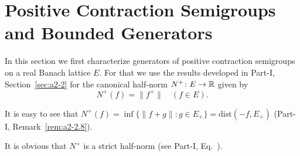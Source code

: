 \section{Positive Contraction Semigroups and Bounded Generators}\label{sec:c2-1}%
In this section we first characterize generators of positive contraction semigroups on a real Banach lattice $E$.
For that we use the results developed in Part-I, Section~\ref{sec:a2-2} for the canonical half-norm $N^{+} \colon E \to \mathbb{R}$ given by
\begin{equation}\label{eq:c2-1.1}
N^{+}(f) = \|f^{+}\| \quad (f \in E).
\end{equation}
\begin{remark*}\label{rem:c2-1.1}
%
It is easy to see that $N^{+}(f) = \inf \{\|f+g\| \colon g \in E_{+}\} = \text{dist}(-f,E_{+})$ (\cf Part-I, Remark~\ref{rem:a2-2.8}). 
\end{remark*}
It is obvious that $N^{+}$ is a strict half-norm (see Part-I, Eq.~). 

